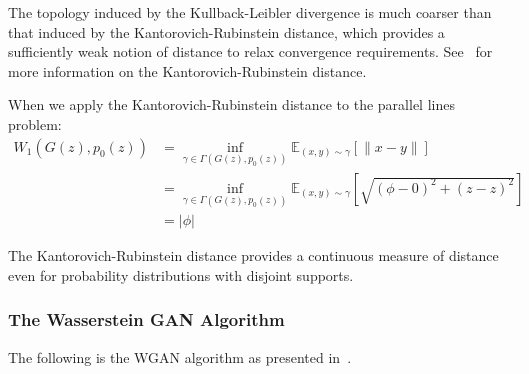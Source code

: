 The topology induced by the Kullback-Leibler divergence is much coarser than that induced by the Kantorovich-Rubinstein distance, which provides a sufficiently weak notion of distance to relax convergence requirements. See~\cite{ref:villani-2008} for more information on the Kantorovich-Rubinstein distance.

\begin{example}
	When we apply the Kantorovich-Rubinstein distance to the parallel lines problem:
	\begin{align}
		W_1(G(z), p_0(z)) & = \inf_{\gamma \in \Gamma(G(z),p_0(z))}\mathbb{E}_{(x,y) \sim \gamma} \left[ \| x-y \| \right]                        \\
		                  & = \inf_{\gamma \in \Gamma(G(z), p_0(z))}\mathbb{E}_{(x,y) \sim \gamma} \left[ \sqrt{(\phi - 0)^2 + (z - z)^2} \right] \\
		                  & = |\phi|
	\end{align}
\end{example}

The Kantorovich-Rubinstein distance provides a continuous measure of distance even for probability distributions with disjoint supports.

\subsubsection*{The Wasserstein GAN Algorithm}

The following is the WGAN algorithm as presented in~\cite{ref:arjovsky-2017}.

